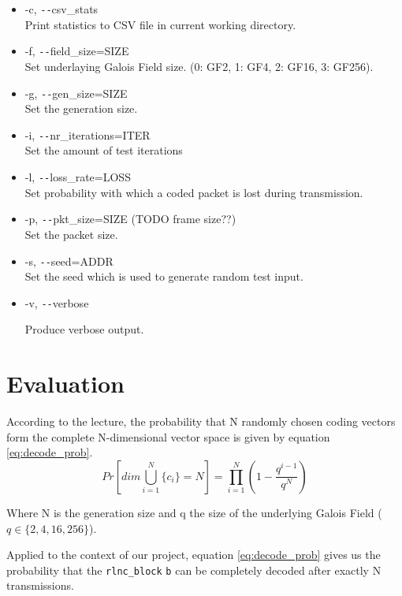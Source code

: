 \documentclass[a4paper,english,10pt]{tumarticle}
\begin{document}
\begin{itemize}
    \item -c, \texttt{-{}-}csv\_stats\\
    Print statistics to CSV file in current working directory.

    \item -f, \texttt{-{}-}field\_size=SIZE\\
    Set underlaying Galois Field size. (0: GF2, 1: GF4, 2: GF16, 3: GF256).

    \item -g, \texttt{-{}-}gen\_size=SIZE\\
    Set the generation size.

    \item -i, \texttt{-{}-}nr\_iterations=ITER\\
    Set the amount of test iterations

    \item -l, \texttt{-{}-}loss\_rate=LOSS\\
    Set probability with which a coded packet is lost during transmission.

    \item -p, \texttt{-{}-}pkt\_size=SIZE (TODO frame size??)\\
    Set the packet size.

    \item -s, \texttt{-{}-}seed=ADDR\\
    Set the seed which is used to generate random test input.
    \item -v, \texttt{-{}-}verbose

    Produce verbose output.
\end{itemize}

\section{Evaluation}\label{eval}
According to the lecture, the probability that N randomly chosen coding vectors form
the complete N-dimensional vector space is given by equation \ref{eq:decode_prob}.
\begin{equation} 
  Pr[dim\bigcup_{i=1}^{N}\{c_i\} = N] = \prod_{i=1}^{N} (1 - \frac{q^{i - 1}}{q ^ {N}})
  \label{eq:decode_prob}
\end{equation}

Where N is the generation size and q the size of the underlying Galois Field ($q \in \{2,4,16,256\}$).

Applied to the context of our project, equation \ref{eq:decode_prob} gives us the probability that the 
\texttt{rlnc\_block} \texttt{b} can be completely decoded after exactly N transmissions.
\end{document}
